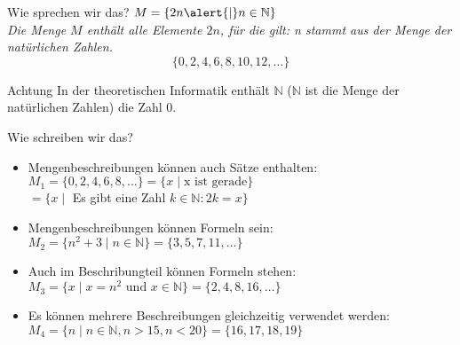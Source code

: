 %
%
%
%

\begin{frame}[fragile]{Wie sprechen wir das?}
    $M = \{2n \alert{\mid} n \in \mathbb{N}\}$ \\

    \emph{Die Menge $M$ enthält alle Elemente $2n$, \alert{für die gilt}: n stammt aus der Menge der natürlichen Zahlen.}
    \vspace{5pt}
    $$
        \{0, 2, 4, 6, 8, 10, 12, \dots \}
    $$

    \begin{alertblock}{Achtung}
        In der theoretischen Informatik enthält $\mathbb{N}$ ($\mathbb{N}$ ist die Menge der natürlichen Zahlen) die Zahl 0.
    \end{alertblock}

\end{frame}


\begin{frame}[fragile]{Wie schreiben wir das?}
    \begin{itemize}[<+->]
        \item Mengenbeschreibungen können auch Sätze enthalten:
              $M_1 = \{0,2,4,6,8,\dots\} = \{x \mid \text{x ist gerade}\}$\\
              \hspace{4.5mm}$= \{x \mid$ Es gibt eine Zahl $k \in \mathbb{N} : 2k = x\}$\\

        \item Mengenbeschreibungen können Formeln sein:
              $M_2 = \{n^2+3 \mid n \in \mathbb{N}\} = \{3, 5, 7, 11, \dots\}$

        \item Auch im Beschribungteil können Formeln stehen:
              $M_3 = \{x \mid x = n^2 \text{ und } x\in \mathbb{N}\} = \{2, 4, 8, 16, \dots\}$

        \item Es können mehrere Beschreibungen gleichzeitig verwendet werden:
              $M_4 = \{n \mid n \in \mathbb{N}, n > 15, n < 20\} = \{16, 17, 18, 19\}$\\

    \end{itemize}
\end{frame}

